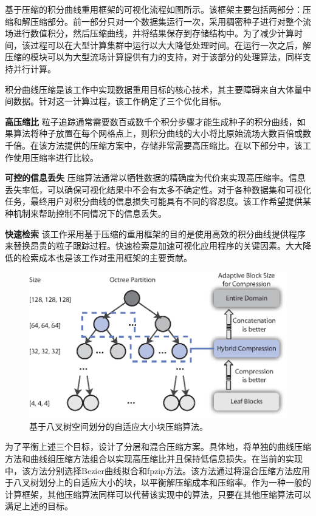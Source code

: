基于压缩的积分曲线重用框架的可视化流程如图所示。该框架主要包括两部分：压缩和解压缩部分。前一部分只对一个数据集运行一次，采用稠密种子进行对整个流场进行数值积分，然后压缩曲线，并将结果保存到存储结构中。为了减少计算时间，该过程可以在大型计算集群中运行以大大降低处理时间。在运行一次之后，解压缩的模块可以为大型流场计算提供有力的支持，对于该部分的处理算法，同样支持并行计算。

积分曲线压缩是该工作中实现数据重用目标的核心技术，其主要障碍来自大体量中间数据。针对这一计算过程，该工作确定了三个优化目标。

{\bf 高压缩比}\quad
粒子追踪通常需要数百或数千个积分步骤才能生成种子的积分曲线，如果算法将种子放置在每个网格点上，则积分曲线的大小将比原始流场大数百倍或数千倍。在该方法提供的压缩方案中，存储非常需要高压缩比。在以下部分中，该工作使用压缩率进行比较。

{\bf 可控的信息丢失}\quad
压缩算法通常以牺牲数据的精确度为代价来实现高压缩率。信息丢失率低，可以确保可视化结果中不会有太多不确定性。对于各种数据集和可视化任务，最终用户对积分曲线的信息损失可能具有不同的容忍度。该工作希望提供某种机制来帮助控制不同情况下的信息丢失。

{\bf 快速检索}\quad
该工作采用基于压缩的重用框架的目的是使用高效的积分曲线提供程序来替换昂贵的粒子跟踪过程。快速检索是加速可视化应用程序的关键因素。大大降低的检索成本也是该工作对重用框架的主要贡献。

\begin{figure}[htbp]
  \centering
  \includegraphics[width=.75\columnwidth]{image/linecompress/recursion.eps}
  \caption{
  基于八叉树空间划分的自适应大小块压缩算法\parencite{hong2017compression}。
  }
  \label{fig:recursion}
\end{figure}

为了平衡上述三个目标，设计了分层和混合压缩方案。具体地，将单独的曲线压缩方法和曲线组压缩方法组合以实现高压缩比并且保持低信息损失。在当前的实现中，该方法分别选择Bezier曲线拟合和fpzip方法。该方法通过将混合压缩方法应用于八叉树划分上的自适应大小的块，以平衡解压缩成本和压缩率。作为一种一般的计算框架，其他压缩算法同样可以代替该实现中的算法，只要在其他压缩算法可以满足上述的目标。

